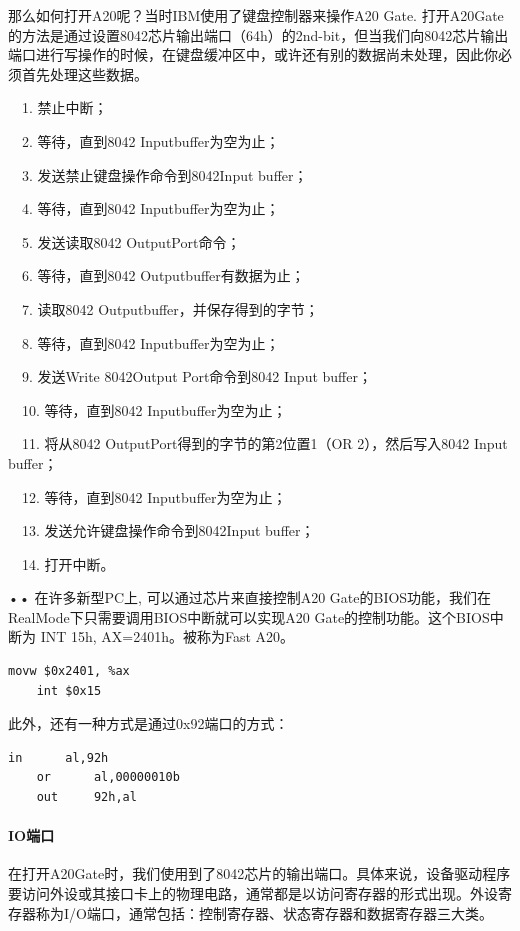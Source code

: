 \documentclass[12pt]{article}
\begin{document}
那么如何打开A20呢？当时IBM使用了键盘控制器来操作A20 Gate. 打开A20Gate的方法是通过设置8042芯片输出端口（64h）的2nd-bit，但当我们向8042芯片输出端口进行写操作的时候，在键盘缓冲区中，或许还有别的数据尚未处理，因此你必须首先处理这些数据。
\begin{list}{•}{•}
\item　1. 禁止中断；
\item　2. 等待，直到8042 Inputbuffer为空为止；
\item　3. 发送禁止键盘操作命令到8042Input buffer；
\item　4. 等待，直到8042 Inputbuffer为空为止；
\item　5. 发送读取8042 OutputPort命令；
\item　6. 等待，直到8042 Outputbuffer有数据为止；
\item　7. 读取8042 Outputbuffer，并保存得到的字节；
\item　8. 等待，直到8042 Inputbuffer为空为止；
\item　9. 发送Write 8042Output Port命令到8042 Input buffer；
\item　10. 等待，直到8042 Inputbuffer为空为止；
\item　11. 将从8042 OutputPort得到的字节的第2位置1（OR 2），然后写入8042 Input buffer；
\item　12. 等待，直到8042 Inputbuffer为空为止；
\item　13. 发送允许键盘操作命令到8042Input buffer；
\item　14. 打开中断。
\end{list}{•}{•}
在许多新型PC上, 可以通过芯片来直接控制A20 Gate的BIOS功能，我们在RealMode下只需要调用BIOS中断就可以实现A20 Gate的控制功能。这个BIOS中断为 INT 15h, AX=2401h。被称为Fast A20。
\begin{lstlisting}[breaklines]
	movw $0x2401, %ax
	int $0x15
\end{lstlisting}	
此外，还有一种方式是通过0x92端口的方式：
\begin{lstlisting}[breaklines]
	in      al,92h
	or      al,00000010b
	out     92h,al
\end{lstlisting}	

\paragraph{IO端口}
在打开A20Gate时，我们使用到了8042芯片的输出端口。具体来说，设备驱动程序要访问外设或其接口卡上的物理电路，通常都是以访问寄存器的形式出现。外设寄存器称为I/O端口，通常包括：控制寄存器、状态寄存器和数据寄存器三大类。
\end{document}
